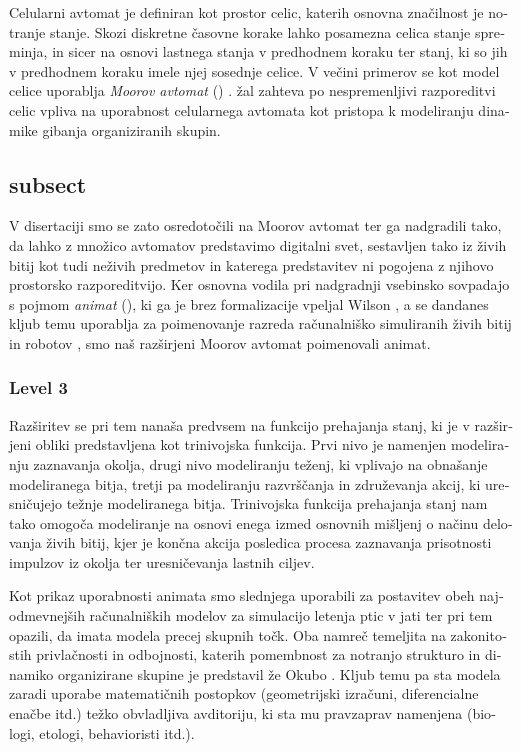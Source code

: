 \begin{slovenian}
Celularni avtomat je definiran kot prostor celic, katerih osnovna značilnost je notranje stanje. Skozi diskretne časovne korake lahko posamezna celica stanje spreminja, in sicer na osnovi lastnega stanja v predhodnem koraku ter stanj, ki so jih v predhodnem koraku imele njej sosednje celice. V večini primerov se kot model celice uporablja \emph{Moorov avtomat} () \cite{mraz:2000}. žal zahteva po nespremenljivi razporeditvi celic vpliva na uporabnost celularnega avtomata kot pristopa k modeliranju dinamike gibanja organiziranih skupin. 
\subsection{subsect}
V disertaciji smo se zato osredotočili na Moorov avtomat ter ga nadgradili tako, da lahko z množico avtomatov predstavimo digitalni svet, sestavljen tako iz živih bitij kot tudi neživih predmetov in katerega predstavitev ni pogojena z njihovo prostorsko razporeditvijo. Ker osnovna vodila pri nadgradnji vsebinsko sovpadajo s pojmom \emph{animat} (), ki ga je brez formalizacije vpeljal Wilson \cite{wilson:1985}, a se dandanes kljub temu uporablja za poimenovanje razreda računalniško simuliranih živih bitij in robotov \cite{cliff:1993,watts:1998}, smo naš razširjeni Moorov avtomat poimenovali animat. 
\subsubsection{Level 3}
Razširitev se pri tem nanaša predvsem na funkcijo prehajanja stanj, ki je v razširjeni obliki predstavljena kot trinivojska funkcija. Prvi nivo je namenjen modeliranju zaznavanja okolja, drugi nivo modeliranju teženj, ki vplivajo na obnašanje modeliranega bitja, tretji pa modeliranju razvrščanja in združevanja akcij, ki uresničujejo težnje modeliranega bitja. Trinivojska funkcija prehajanja stanj nam tako omogoča modeliranje na osnovi enega izmed osnovnih mišljenj o načinu delovanja živih bitij, kjer je končna akcija posledica procesa zaznavanja prisotnosti impulzov iz okolja ter uresničevanja lastnih ciljev.

Kot prikaz uporabnosti animata smo slednjega uporabili za postavitev obeh najodmevnejših računalniških modelov za simulacijo letenja ptic v jati ter pri tem opazili, da imata modela precej skupnih točk. Oba namreč temeljita na zakonitostih privlačnosti in odbojnosti, katerih pomembnost za notranjo strukturo in dinamiko organizirane skupine je predstavil že Okubo \cite{okubo:1980}. Kljub temu pa sta modela zaradi uporabe matematičnih postopkov (geometrijski izračuni, diferencialne enačbe itd.) težko obvladljiva avditoriju, ki sta mu pravzaprav namenjena (biologi, etologi, behavioristi itd.).


\end{slovenian}
